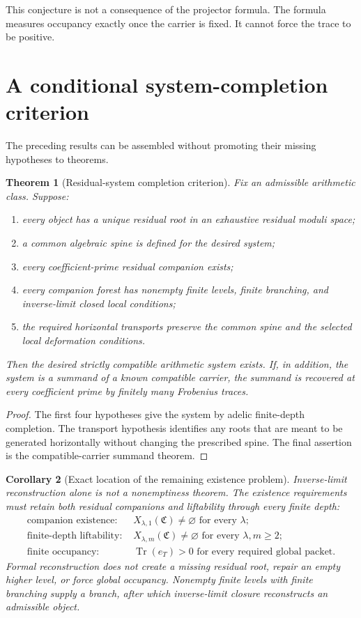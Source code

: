 \documentclass[11pt]{article}
\newtheorem{theorem}{Theorem}[section]
\newtheorem{corollary}[theorem]{Corollary}
\theoremstyle{definition}
\theoremstyle{remark}
\newcommand{\Tr}{\operatorname{Tr}}
\newcommand{\Compat}{\mathfrak C}
\begin{document}
This conjecture is not a consequence of the projector formula.  The formula measures occupancy exactly once the carrier is fixed.  It cannot force the trace to be positive.

\section{A conditional system-completion criterion}

The preceding results can be assembled without promoting their missing hypotheses to theorems.

\begin{theorem}[Residual-system completion criterion]
Fix an admissible arithmetic class.  Suppose:
\begin{enumerate}
\item every object has a unique residual root in an exhaustive residual moduli space;
\item a common algebraic spine is defined for the desired system;
\item every coefficient-prime residual companion exists;
\item every companion forest has nonempty finite levels, finite branching, and inverse-limit closed local conditions;
\item the required horizontal transports preserve the common spine and the selected local deformation conditions.
\end{enumerate}
Then the desired strictly compatible arithmetic system exists.  If, in addition, the system is a summand of a known compatible carrier, the summand is recovered at every coefficient prime by finitely many Frobenius traces.
\end{theorem}

\begin{proof}
The first four hypotheses give the system by adelic finite-depth completion.  The transport hypothesis identifies any roots that are meant to be generated horizontally without changing the prescribed spine.  The final assertion is the compatible-carrier summand theorem.
\end{proof}

\begin{corollary}[Exact location of the remaining existence problem]
Inverse-limit reconstruction alone is not a nonemptiness theorem.  The existence requirements must retain both residual companions and liftability through every finite depth:
\[
\boxed{
\begin{aligned}
\text{companion existence: }&X_{\lambda,1}(\Compat)\ne\varnothing
\text{ for every }\lambda;\\
\text{finite-depth liftability: }&X_{\lambda,m}(\Compat)\ne\varnothing
\text{ for every }\lambda,m\ge2;\\
\text{finite occupancy: }&\Tr(e_T)>0
\text{ for every required global packet.}
\end{aligned}}
\]
Formal reconstruction does not create a missing residual root, repair an empty higher level, or force global occupancy.  Nonempty finite levels with finite branching supply a branch, after which inverse-limit closure reconstructs an admissible object.
\end{corollary}
\end{document}
